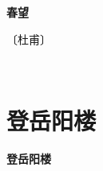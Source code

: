\documentclass[12pt,UTF-8,openany,fontset=none]{ctexbook}
\begin{document}

\begin{center}
    {\bfseries 春望}
\end{center}

\begin{center}
    \vspace{10pt}
    
    \begin{large}
        
        〔杜甫〕
        
    \end{large}
    
    \vspace{8pt}
    
    \begin{huge}
        
        \phantom{。}

        \phantom{。}
        
        \phantom{。}

        \phantom{。}
        
        \phantom{。}

        \phantom{。}
        
        \phantom{。}

        \phantom{。}~~
        
    \end{huge}
    
\end{center}

\vspace{8pt}
\clearpage

\section{登岳阳楼}



\begin{center}
    {\bfseries 登岳阳楼}
\end{center}
\end{document}

